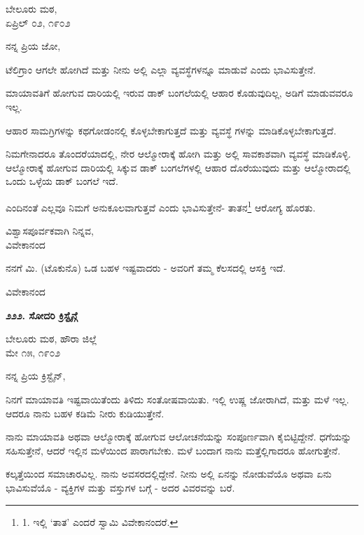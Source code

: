 \begin{flushright}
ಬೇಲೂರು ಮಠ,\\ಏಪ್ರಿಲ್ ೦೨, ೧೯೦೨
\end{flushright}

ನನ್ನ ಪ್ರಿಯ ಜೋ,

ಟೆಲಿಗ್ರಾಂ ಆಗಲೇ ಹೋಗಿದೆ ಮತ್ತು ನೀನು ಅಲ್ಲಿ ಎಲ್ಲಾ ವ್ಯವಸ್ಥೆಗಳನ್ನೂ ಮಾಡುವೆ ಎಂದು ಭಾವಿಸುತ್ತೇನೆ.

ಮಾಯಾವತಿಗೆ ಹೋಗುವ ದಾರಿಯಲ್ಲಿ ಇರುವ ಡಾಕ್ ಬಂಗಲೆಯಲ್ಲಿ ಆಹಾರ ಕೊಡುವುದಿಲ್ಲ, ಅಡಿಗೆ ಮಾಡುವವರೂ ಇಲ್ಲ.

ಆಹಾರ ಸಾಮಗ್ರಿಗಳನ್ನು ಕಥಗೋಡಂನಲ್ಲಿ ಕೊಳ್ಳಬೇಕಾಗುತ್ತದೆ ಮತ್ತು ವ್ಯವಸ್ಥೆ ಗಳನ್ನು ಮಾಡಿಕೊಳ್ಳಬೇಕಾಗುತ್ತದೆ.

ನಿಮಗೇನಾದರೂ ತೊಂದರೆಯಾದಲ್ಲಿ, ನೇರ ಆಲ್ಮೋರಾಕ್ಕೆ ಹೋಗಿ ಮತ್ತು ಅಲ್ಲಿ ಸಾವಕಾಶವಾಗಿ ವ್ಯವಸ್ಥೆ ಮಾಡಿಕೊಳ್ಳಿ. ಆಲ್ಮೋರಾಕ್ಕೆ ಹೋಗುವ ದಾರಿಯಲ್ಲಿ ಸಿಕ್ಕುವ ಡಾಕ್ ಬಂಗಲೆಗಳಲ್ಲಿ ಆಹಾರ ದೊರೆಯುವುದು ಮತ್ತು ಆಲ್ಮೋರಾದಲ್ಲಿ ಒಂದು ಒಳ್ಳೆಯ ಡಾಕ್ ಬಂಗಲೆ ಇದೆ.

ಎಂದಿನಂತೆ ಎಲ್ಲವೂ ನಿಮಗೆ ಅನುಕೂಲವಾಗುತ್ತವೆ ಎಂದು ಭಾವಿಸುತ್ತೇನೆ- ತಾತನ\footnote{1. ಇಲ್ಲಿ ‘ತಾತ’ ಎಂದರೆ ಸ್ವಾಮಿ ವಿವೇಕಾನಂದರೆ.} ಆರೋಗ್ಯ ಹೊರತು.

\begin{flushright}
ವಿಶ್ವಾಸಪೂರ್ವಕವಾಗಿ ನಿನ್ನವ,\\ವಿವೇಕಾನಂದ
\end{flushright}

ನನಗೆ ಮಿ. (ಟೊಕುನೊ) ಒಡ ಬಹಳ ಇಷ್ಟವಾದರು - ಅವರಿಗೆ ತಮ್ಮ ಕೆಲಸದಲ್ಲಿ ಆಸಕ್ತಿ ಇದೆ.

\begin{flushright}
ವಿವೇಕಾನಂದ
\end{flushright}

\begin{center}
\textbf{೨೨೨. ಸೋದರಿ ಕ್ರಿಸ್ಟೈನ್ಗೆ}
\end{center}

\begin{flushright}
ಬೇಲೂರು ಮಠ, ಹೌರಾ ಜಿಲ್ಲೆ\\ಮೇ ೧೫, ೧೯೦೨
\end{flushright}

ನನ್ನ ಪ್ರಿಯ ಕ್ರಿಸ್ಟೈನ್,

ನಿನಗೆ ಮಾಯಾವತಿ ಇಷ್ಟವಾಯಿತೆಂದು ತಿಳಿದು ಸಂತೋಷವಾಯಿತು. ಇಲ್ಲಿ ಉಷ್ಣ ಜೋರಾಗಿದೆ, ಮತ್ತು ಮಳೆ ಇಲ್ಲ. ಆದರೂ ನಾನು ಬಹಳ ಕಡಿಮೆ ನೀರು ಕುಡಿಯುತ್ತೇನೆ.

ನಾನು ಮಾಯಾವತಿ ಅಥವಾ ಆಲ್ಮೋರಾಕ್ಕೆ ಹೋಗುವ ಆಲೋಚನೆಯನ್ನು ಸಂಪೂರ್ಣವಾಗಿ ಕೈಬಿಟ್ಟಿದ್ದೇನೆ. ಧಗೆಯನ್ನು ಸಹಿಸುತ್ತೇನೆ, ಆದರೆ ಇಲ್ಲಿನ ಮಳೆಯಿಂದ ಪಾರಾಗಬೇಕು. ಮಳೆ ಬಂದಾಗ ನಾನು ಮತ್ತೆಲ್ಲಿಗಾದರೂ ಹೋಗುತ್ತೇನೆ.

ಕಲ್ಕತ್ತೆಯಿಂದ ಸಮಾಚಾರವಿಲ್ಲ. ನಾನು ಅವಸರದಲ್ಲಿದ್ದೇನೆ. ನೀನು ಅಲ್ಲಿ ಏನನ್ನು ನೋಡುವೆಯೊ ಅಥವಾ ಏನು ಭಾವಿಸುವೆಯೊ - ವ್ಯಕ್ತಿಗಳ ಮತ್ತು ವಸ್ತುಗಳ ಬಗ್ಗೆ - ಅದರ ವಿವರವನ್ನು ಬರೆ.

